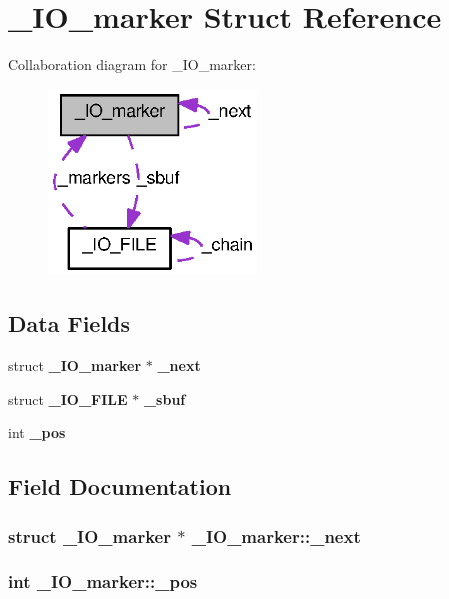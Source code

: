 \section{\_\-IO\_\-marker Struct Reference}
\label{struct__IO__marker}


Collaboration diagram for \_\-IO\_\-marker:
\nopagebreak
\begin{figure}[H]
\begin{center}
\leavevmode
\includegraphics[width=157pt]{struct__IO__marker__coll__graph}
\end{center}
\end{figure}
\subsection*{Data Fields}
\begin{DoxyCompactItemize}
\item 
struct {\bf \_\-IO\_\-marker} $\ast$ {\bf \_\-next}
\item 
struct {\bf \_\-IO\_\-FILE} $\ast$ {\bf \_\-sbuf}
\item 
int {\bf \_\-pos}
\end{DoxyCompactItemize}


\subsection{Field Documentation}
\subsubsection[{\_\-next}]{\setlength{\rightskip}{0pt plus 5cm}struct {\bf \_\-IO\_\-marker} $\ast$ {\bf \_\-IO\_\-marker::\_\-next}}\label{struct__IO__marker_a89ef5d2fd7550af75be0f659d8c9b4cd}
\subsubsection[{\_\-pos}]{\setlength{\rightskip}{0pt plus 5cm}int {\bf \_\-IO\_\-marker::\_\-pos}}\label{struct__IO__marker_a3f83a64703190d685175dc43b9e122a6}

